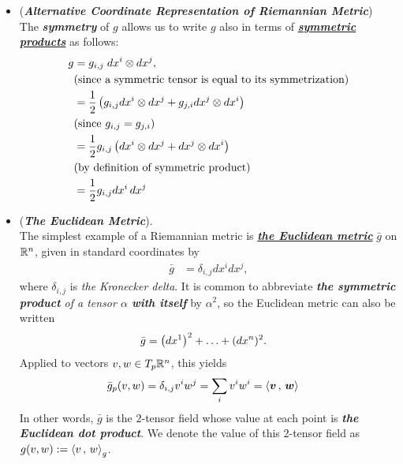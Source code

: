 \documentclass[11pt]{article}
\begin{document}
\begin{itemize}
\item \begin{remark} (\emph{\textbf{Alternative Coordinate Representation of Riemannian Metric}})\\
The \emph{\textbf{symmetry}} of $g$ allows us to write $g$ also in terms of \underline{\emph{\textbf{symmetric products}}} as follows:
\begin{align}
g &= g_{i,j}\;dx^i \otimes dx^j,  \nonumber\\
&(\text{since  a symmetric tensor is equal to its symmetrization})  \nonumber\\
&=  \frac{1}{2}\left(g_{i,j}dx^i \otimes dx^j + g_{j,i} dx^j \otimes dx^i\right) \nonumber\\
&(\text{since  }g_{i,j} = g_{j,i})  \nonumber\\
&= \frac{1}{2}g_{i,j}\left(dx^i \otimes dx^j + dx^j \otimes dx^i\right) \nonumber\\
&(\text{by definition of symmetric product})  \nonumber\\
&=\frac{1}{2}g_{i,j} dx^i\,dx^{j} \label{eqn: riemannian_metric_symmetric_product}
\end{align}
\end{remark}

\item \begin{example}(\emph{\textbf{The Euclidean Metric}}).\\
The simplest example of a Riemannian metric is \underline{\emph{\textbf{the Euclidean metric}}} $\bar{g}$ on ${\mathbb R}^n$, given in standard coordinates by 
\begin{align*}
\bar{g} &= \delta_{i,j} dx^i dx^j,
\end{align*} where $\delta_{i,j}$ is \emph{the Kronecker delta}. It is common to abbreviate \emph{\textbf{the symmetric product} of a tensor $\alpha$ \textbf{with itself}} by $\alpha^2$, so the Euclidean metric can also be written
\begin{align*}
\bar{g} &= \left(dx^1\right)^2 + \ldots + (dx^n)^2.
\end{align*} 
Applied to vectors $v,w \in T_{p}{\mathbb R}^n$, this yields 
\begin{align*}
\bar{g}_{p}(v,w) &= \delta_{i,j} v^i w^j   = \sum_{i}v^i w^i = \left\langle \boldsymbol{v}\,,\, \boldsymbol{w} \right\rangle
\end{align*} In other words, $\bar{g}$ is the $2$-tensor field whose value at each point is \emph{\textbf{the Euclidean dot product}}. We denote the value of this 2-tensor field as $g(v, w) := \left\langle v\,,\, w \right\rangle_g$.
\end{example}


\end{itemize}
\end{document}
